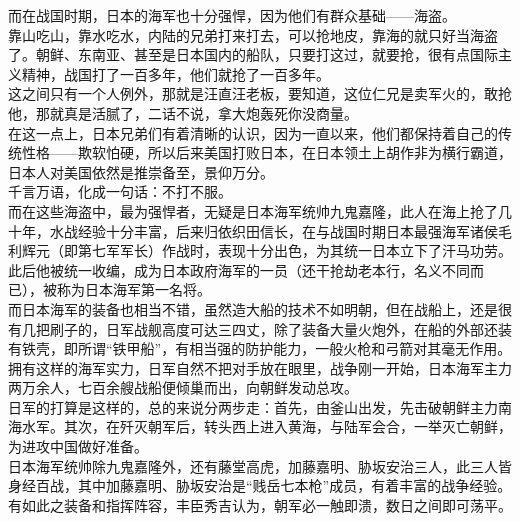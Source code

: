 \begin{multicols}{\theparacolNo}
而在战国时期，日本的海军也十分强悍，因为他们有群众基础——海盗。\\

靠山吃山，靠水吃水，内陆的兄弟打来打去，可以抢地皮，靠海的就只好当海盗了。朝鲜、东南亚、甚至是日本国内的船队，只要打这过，就要抢，很有点国际主义精神，战国打了一百多年，他们就抢了一百多年。\\

这之间只有一个人例外，那就是汪直汪老板，要知道，这位仁兄是卖军火的，敢抢他，那就真是活腻了，二话不说，拿大炮轰死你没商量。\\

在这一点上，日本兄弟们有着清晰的认识，因为一直以来，他们都保持着自己的传统性格——欺软怕硬，所以后来美国打败日本，在日本领土上胡作非为横行霸道，日本人对美国依然是推崇备至，景仰万分。\\

千言万语，化成一句话：不打不服。\\

而在这些海盗中，最为强悍者，无疑是日本海军统帅九鬼嘉隆，此人在海上抢了几十年，水战经验十分丰富，后来归依织田信长，在与战国时期日本最强海军诸侯毛利辉元（即第七军军长）作战时，表现十分出色，为其统一日本立下了汗马功劳。\\

此后他被统一收编，成为日本政府海军的一员（还干抢劫老本行，名义不同而已），被称为日本海军第一名将。\\

而日本海军的装备也相当不错，虽然造大船的技术不如明朝，但在战船上，还是很有几把刷子的，日军战舰高度可达三四丈，除了装备大量火炮外，在船的外部还装有铁壳，即所谓“铁甲船”，有相当强的防护能力，一般火枪和弓箭对其毫无作用。\\

拥有这样的海军实力，日军自然不把对手放在眼里，战争刚一开始，日本海军主力两万余人，七百余艘战船便倾巢而出，向朝鲜发动总攻。\\

日军的打算是这样的，总的来说分两步走：首先，由釜山出发，先击破朝鲜主力南海水军。其次，在歼灭朝军后，转头西上进入黄海，与陆军会合，一举灭亡朝鲜，为进攻中国做好准备。\\

日本海军统帅除九鬼嘉隆外，还有藤堂高虎，加藤嘉明、胁坂安治三人，此三人皆身经百战，其中加藤嘉明、胁坂安治是“贱岳七本枪”成员，有着丰富的战争经验。\\

有如此之装备和指挥阵容，丰臣秀吉认为，朝军必一触即溃，数日之间即可荡平。\\


\end{multicols}
